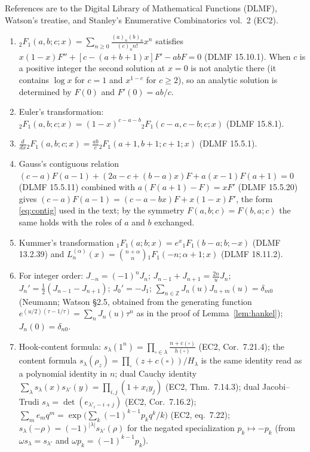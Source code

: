 \documentclass[11pt]{article}
\theoremstyle{definition}
\theoremstyle{remark}
\newcommand{\Z}{\mathbb{Z}}
\begin{document}
References are to the Digital Library of Mathematical Functions (DLMF), Watson's treatise, and Stanley's Enumerative Combinatorics vol.~2 (EC2).
\begin{enumerate}[label=(H\arabic*),leftmargin=3em]
\item \label{H:series} ${}_2F_1(a,b;c;x)=\sum_{n\ge0}\frac{(a)_n(b)_n}{(c)_nn!}x^n$ satisfies $x(1-x)F''+[c-(a+b+1)x]F'-abF=0$ (DLMF 15.10.1). When $c$ is a positive integer the second solution at $x=0$ is not analytic there (it contains $\log x$ for $c=1$ and $x^{1-c}$ for $c\ge2$), so an analytic solution is determined by $F(0)$ and $F'(0)=ab/c$.
\item \label{H:euler} Euler's transformation: ${}_2F_1(a,b;c;x)=(1-x)^{c-a-b}{}_2F_1(c-a,c-b;c;x)$ (DLMF 15.8.1).
\item \label{H:deriv} $\frac{d}{dx}{}_2F_1(a,b;c;x)=\frac{ab}c{}_2F_1(a+1,b+1;c+1;x)$ (DLMF 15.5.1).
\item \label{H:contig} Gauss's contiguous relation $(c-a)F(a-1)+(2a-c+(b-a)x)F+a(x-1)F(a+1)=0$ (DLMF 15.5.11) combined with $a(F(a+1)-F)=xF'$ (DLMF 15.5.20) gives $(c-a)F(a-1)=(c-a-bx)F+x(1-x)F'$, the form \eqref{eq:contig} used in the text; by the symmetry $F(a,b;c)=F(b,a;c)$ the same holds with the roles of $a$ and $b$ exchanged.
\item \label{H:kummer} Kummer's transformation ${}_1F_1(a;b;x)=e^x{}_1F_1(b-a;b;-x)$ (DLMF 13.2.39) and $L^{(\alpha)}_n(x)=\binom{n+\alpha}n{}_1F_1(-n;\alpha+1;x)$ (DLMF 18.11.2).
\item \label{H:bessel} For integer order: $J_{-n}=(-1)^nJ_n$; $J_{n-1}+J_{n+1}=\frac{2n}uJ_n$; $J_n'=\frac12(J_{n-1}-J_{n+1})$; $J_0'=-J_1$; $\sum_{n\in\Z}J_n(u)J_{n+m}(u)=\delta_{m0}$ (Neumann; Watson \S2.5, obtained from the generating function $e^{(u/2)(\tau-1/\tau)}=\sum_nJ_n(u)\tau^n$ as in the proof of Lemma~\ref{lem:hankel}); $J_n(0)=\delta_{n0}$.
\item \label{H:hook} Hook-content formula: $s_\lambda(1^n)=\prod_{\square\in\lambda}\frac{n+c(\square)}{h(\square)}$ (EC2, Cor.~7.21.4); the content formula $s_\lambda(\rho_z)=\prod_\square(z+c(\square))/H_\lambda$ is the same identity read as a polynomial identity in $n$; dual Cauchy identity $\sum_\lambda s_\lambda(x)s_{\lambda'}(y)=\prod_{i,j}(1+x_iy_j)$ (EC2, Thm.~7.14.3); dual Jacobi--Trudi $s_\lambda=\det(e_{\lambda'_i-i+j})$ (EC2, Cor.~7.16.2); $\sum_me_mq^m=\exp\bigl(\sum_k(-1)^{k-1}p_kq^k/k\bigr)$ (EC2, eq.~7.22); $s_\lambda(-\rho)=(-1)^{|\lambda|}s_{\lambda'}(\rho)$ for the negated specialization $p_k\mapsto-p_k$ (from $\omega s_\lambda=s_{\lambda'}$ and $\omega p_k=(-1)^{k-1}p_k$).

\end{enumerate}
\end{document}
